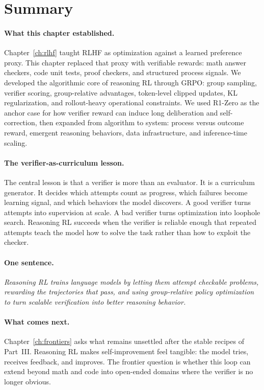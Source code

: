 \section*{Summary}

\paragraph{What this chapter established.} Chapter~\ref{ch:rlhf} taught RLHF as optimization against a learned preference proxy. This chapter replaced that proxy with verifiable rewards: math answer checkers, code unit tests, proof checkers, and structured process signals. We developed the algorithmic core of reasoning RL through GRPO: group sampling, verifier scoring, group-relative advantages, token-level clipped updates, KL regularization, and rollout-heavy operational constraints. We used R1-Zero as the anchor case for how verifier reward can induce long deliberation and self-correction, then expanded from algorithm to system: process versus outcome reward, emergent reasoning behaviors, data infrastructure, and inference-time scaling.

\paragraph{The verifier-as-curriculum lesson.} The central lesson is that a verifier is more than an evaluator. It is a curriculum generator. It decides which attempts count as progress, which failures become learning signal, and which behaviors the model discovers. A good verifier turns attempts into supervision at scale. A bad verifier turns optimization into loophole search. Reasoning RL succeeds when the verifier is reliable enough that repeated attempts teach the model how to solve the task rather than how to exploit the checker.

\paragraph{One sentence.} \emph{Reasoning RL trains language models by letting them attempt checkable problems, rewarding the trajectories that pass, and using group-relative policy optimization to turn scalable verification into better reasoning behavior.}

\paragraph{What comes next.} Chapter~\ref{ch:frontiers} asks what remains unsettled after the stable recipes of Part~III. Reasoning RL makes self-improvement feel tangible: the model tries, receives feedback, and improves. The frontier question is whether this loop can extend beyond math and code into open-ended domains where the verifier is no longer obvious.


